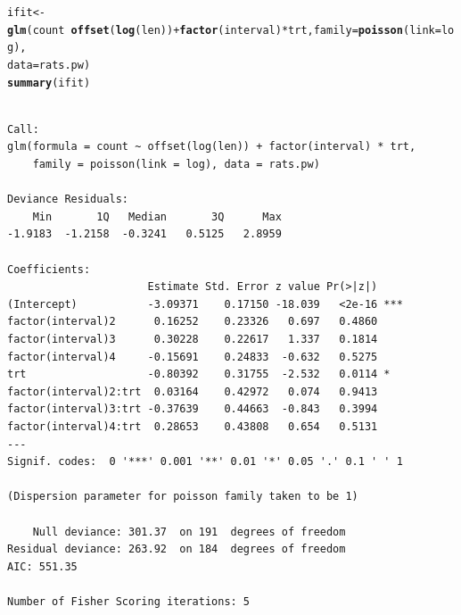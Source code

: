 \documentclass{article}\usepackage[]{graphicx}\usepackage[svgnames]{xcolor}
\makeatletter
\newcommand{\hlopt}[1]{\textcolor[rgb]{0,0,0}{#1}}%
\newcommand{\hlstd}[1]{\textcolor[rgb]{0.345,0.345,0.345}{#1}}%
\newcommand{\hlkwb}[1]{\textcolor[rgb]{0.69,0.353,0.396}{#1}}%
\newcommand{\hlkwc}[1]{\textcolor[rgb]{0.333,0.667,0.333}{#1}}%
\newcommand{\hlkwd}[1]{\textcolor[rgb]{0.737,0.353,0.396}{\textbf{#1}}}%
\newenvironment{kframe}{%
 \def\at@end@of@kframe{}%
 \ifinner\ifhmode%
  \def\at@end@of@kframe{\end{minipage}}%
  \begin{minipage}{\columnwidth}%
 \fi\fi%
 \def\FrameCommand##1{\hskip\@totalleftmargin \hskip-\fboxsep
 \colorbox{shadecolor}{##1}\hskip-\fboxsep
     \hskip-\linewidth \hskip-\@totalleftmargin \hskip\columnwidth}%
 \MakeFramed {\advance\hsize-\width
   \@totalleftmargin\z@ \linewidth\hsize
   \@setminipage}}%
 {\par\unskip\endMakeFramed%
 \at@end@of@kframe}
\newenvironment{knitrout}{}{} %
\makeatother
\begin{document}
\begin{knitrout}
\color{fgcolor}\begin{kframe}
\begin{alltt}
\hlstd{ifit} \hlkwb{<-} \hlkwd{glm}\hlstd{(count} \hlopt{~} \hlkwd{offset}\hlstd{(}\hlkwd{log}\hlstd{(len))} \hlopt{+} \hlkwd{factor}\hlstd{(interval)} \hlopt{*} \hlstd{trt,} \hlkwc{family} \hlstd{=} \hlkwd{poisson}\hlstd{(}\hlkwc{link} \hlstd{= log),}
  \hlkwc{data} \hlstd{= rats.pw)}
\hlkwd{summary}\hlstd{(ifit)}
\end{alltt}
\begin{verbatim}

Call:
glm(formula = count ~ offset(log(len)) + factor(interval) * trt, 
    family = poisson(link = log), data = rats.pw)

Deviance Residuals: 
    Min       1Q   Median       3Q      Max  
-1.9183  -1.2158  -0.3241   0.5125   2.8959  

Coefficients:
                      Estimate Std. Error z value Pr(>|z|)    
(Intercept)           -3.09371    0.17150 -18.039   <2e-16 ***
factor(interval)2      0.16252    0.23326   0.697   0.4860    
factor(interval)3      0.30228    0.22617   1.337   0.1814    
factor(interval)4     -0.15691    0.24833  -0.632   0.5275    
trt                   -0.80392    0.31755  -2.532   0.0114 *  
factor(interval)2:trt  0.03164    0.42972   0.074   0.9413    
factor(interval)3:trt -0.37639    0.44663  -0.843   0.3994    
factor(interval)4:trt  0.28653    0.43808   0.654   0.5131    
---
Signif. codes:  0 '***' 0.001 '**' 0.01 '*' 0.05 '.' 0.1 ' ' 1

(Dispersion parameter for poisson family taken to be 1)

    Null deviance: 301.37  on 191  degrees of freedom
Residual deviance: 263.92  on 184  degrees of freedom
AIC: 551.35

Number of Fisher Scoring iterations: 5
\end{verbatim}
\end{kframe}
\end{knitrout}
\end{document}
